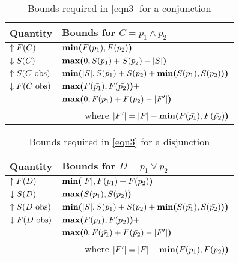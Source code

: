 \begin{table}[tb]
  \caption{Bounds required in \autoref{eqn3} for a conjunction}
  \label{tab:bounds-conj}
  \centering
  \begin{tabular}{ll}
    \toprule
    Quantity & Bounds for $C = p_1 \wedge p_2$ \\
    \midrule
    $\uparrow F(C) $
      &
      $\textbf{min(}F(p_1), F(p_2)\textbf{)}$
      \\
      
    $\downarrow S(C)$
      &
      $\textbf{max(}0, S(p_1) + S(p_2) - |S|\textbf{)}$
      \\
    
    $\uparrow S(\text{$C$ obs})$
      &
      $\textbf{min(}|S|, S(\text{$\bar{p_1}$}) + S(\text{$\bar{p_2}$}) + \textbf{min(}S(p_1), S(p_2)\textbf{)}\textbf{)}$
      \\
        
    $\downarrow F(\text{$C$ obs})$
      &
      $\textbf{max(}F(\text{$\bar{p_1}$}), F(\text{$\bar{p_2}$})\textbf{)} +$
      \\
      
      &
      $\textbf{max(}0, F(p_1) + F(p_2) - |F'|\textbf{)}$
      \\
      
      &
      \multicolumn{1}{r}{where $|F'| = |F| - \textbf{min(}F(\text{$\bar{p_1}$}), F(\text{$\bar{p_2}$})\textbf{)}$}
      \\
    \bottomrule
  \end{tabular}
\end{table}

\begin{table}[tb]
  \caption{Bounds required in \autoref{eqn3} for a disjunction}
  \label{tab:bounds-disj}
  \centering
  \begin{tabular}{ll}
    \toprule
    Quantity & Bounds for $D = p_1 \vee p_2$ \\
    \midrule
    $\uparrow F(D) $
      &
      $\textbf{min(}|F|, F(p_1) + F(p_2)\textbf{)}$
      \\
      
    $\downarrow S(D)$
      &
      $\textbf{max(}S(p_1), S(p_2)\textbf{)}$
      \\
      
    $\uparrow S(\text{$D$ obs})$
      &
      $\textbf{min(}|S|, S(p_1) + S(p_2) + \textbf{min(}S(\text{$\bar{p_1}$}), S(\text{$\bar{p_2}$})\textbf{)}\textbf{)}$
      \\
        
    $\downarrow F(\text{$D$ obs})$
      &
      $\textbf{max(}F(p_1), F(p_2)\textbf{)} +$
      \\
      
      &
      $\textbf{max(}0, F(\text{$\bar{p_1}$}) + F(\text{$\bar{p_2}$}) - |F'|\textbf{)}$
      \\
      
      &
      \multicolumn{1}{r}{where $|F'| = |F| - \textbf{min(}F(p_1), F(p_2)\textbf{)}$}
      \\
    \bottomrule
  \end{tabular}
\end{table}


